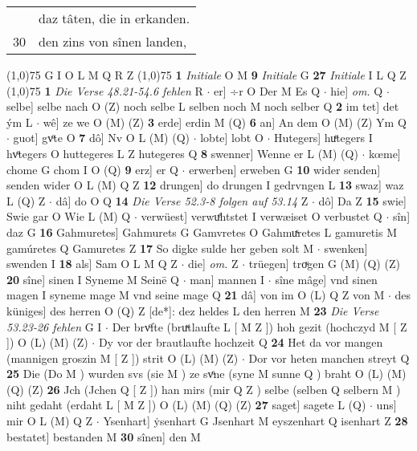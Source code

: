 \documentclass[8pt,a4paper,notitlepage]{article}
\begin{document}
\begin{table}[ht]
\begin{minipage}[t]{0.5\linewidth}
\begin{tabular}{rl}
 & daz tâten, die in erkanden.\\ 
30 & den zins von sînen landen,\\ 
\end{tabular}
\scriptsize
\line(1,0){75} \newline
G I O L M Q R Z \newline
\line(1,0){75} \newline
\textbf{1} \textit{Initiale} O M  \textbf{9} \textit{Initiale} G  \textbf{27} \textit{Initiale} I L Q Z  \newline
\line(1,0){75} \newline
\textbf{1} \textit{Die Verse 48.21-54.6 fehlen} R   $\cdot$ er] ÷r O Der M Es Q  $\cdot$ hie] \textit{om.} Q  $\cdot$ selbe] selbe nach O (Z) noch selbe L selben noch M noch selber Q \textbf{2} im tet] det ým L  $\cdot$ wê] ze we O (M) (Z) \textbf{3} erde] erdin M (Q) \textbf{6} an] An dem O (M) (Z) Ym Q  $\cdot$ guot] gvͦte O \textbf{7} dô] Nv O L (M) (Q)  $\cdot$ lobte] lobt O  $\cdot$ Hutegers] huͤtegers I hvͦtegers O huttegeres L Z hutegeres Q \textbf{8} swenner] Wenne er L (M) (Q)  $\cdot$ kœme] chome G chom I O (Q) \textbf{9} erz] er Q  $\cdot$ erwerben] erweben G \textbf{10} wider senden] senden wider O L (M) Q Z \textbf{12} drungen] do drungen I gedrvngen L \textbf{13} swaz] waz L (Q) Z  $\cdot$ dâ] do O Q \textbf{14} \textit{Die Verse 52.3-8 folgen auf 53.14} Z   $\cdot$ dô] Da Z \textbf{15} swie] Swie gar O Wie L (M) Q  $\cdot$ verwüest] verwuͤhtstet I verwæiset O verbustet Q  $\cdot$ sîn] daz G \textbf{16} Gahmuretes] Gahmurets G Gamvretes O Gahmuͯretes L gamuretis M gamúretes Q Gamuretes Z \textbf{17} So digke sulde her geben solt M  $\cdot$ swenken] swenden I \textbf{18} als] Sam O L M Q Z  $\cdot$ die] \textit{om.} Z  $\cdot$ trüegen] troͮgen G (M) (Q) (Z) \textbf{20} sîne] sinen I Syneme M Seinē Q  $\cdot$ man] mannen I  $\cdot$ sîne mâge] vnd sinen magen I syneme mage M vnd seine mage Q \textbf{21} dâ] von im O (L) Q Z von M  $\cdot$ des küniges] des herren O (Q) Z [de*]: dez heldes L den herren M \textbf{23} \textit{Die Verse 53.23-26 fehlen} G I   $\cdot$ Der brvͦfte (bruͯtlaufte L [ M Z ]) hoh gezit (hochczyd M [ Z ]) O (L) (M) (Z)  $\cdot$ Dy vor der brautlaufte hochzeit Q \textbf{24} Het da vor mangen (mannigen groszin M [ Z ]) strit O (L) (M) (Z)  $\cdot$ Dor vor heten manchen streyt Q \textbf{25} Die (Do M ) wurden svs (sie M ) ze svͦne (syne M sunne Q ) braht O (L) (M) (Q) (Z) \textbf{26} Jch (Jchen Q [ Z ]) han mirs (mir Q Z ) selbe (selben Q selbern M ) niht gedaht (erdaht L [ M Z ]) O (L) (M) (Q) (Z) \textbf{27} saget] sagete L (Q)  $\cdot$ uns] mir O L (M) Q Z  $\cdot$ Ysenhart] ẏsenhart G Jsenhart M eyszenhart Q isenhart Z \textbf{28} bestatet] bestanden M \textbf{30} sînen] den M \newline

\end{minipage}
\end{table}
\end{document}
